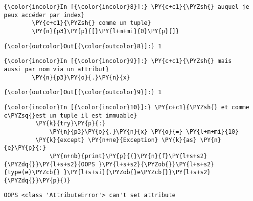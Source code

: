     \begin{Verbatim}[commandchars=\\\{\},frame=single,framerule=0.3mm,rulecolor=\color{cellframecolor}]
{\color{incolor}In [{\color{incolor}8}]:} \PY{c+c1}{\PYZsh{} auquel je peux accéder par index}
        \PY{c+c1}{\PYZsh{} comme un tuple}
        \PY{n}{p3}\PY{p}{[}\PY{l+m+mi}{0}\PY{p}{]}
\end{Verbatim}


\begin{Verbatim}[commandchars=\\\{\},frame=single,framerule=0.3mm,rulecolor=\color{cellframecolor}]
{\color{outcolor}Out[{\color{outcolor}8}]:} 1
\end{Verbatim}
            
    \begin{Verbatim}[commandchars=\\\{\},frame=single,framerule=0.3mm,rulecolor=\color{cellframecolor}]
{\color{incolor}In [{\color{incolor}9}]:} \PY{c+c1}{\PYZsh{} mais aussi par nom via un attribut}
        \PY{n}{p3}\PY{o}{.}\PY{n}{x}
\end{Verbatim}


\begin{Verbatim}[commandchars=\\\{\},frame=single,framerule=0.3mm,rulecolor=\color{cellframecolor}]
{\color{outcolor}Out[{\color{outcolor}9}]:} 1
\end{Verbatim}
            
    \begin{Verbatim}[commandchars=\\\{\},frame=single,framerule=0.3mm,rulecolor=\color{cellframecolor}]
{\color{incolor}In [{\color{incolor}10}]:} \PY{c+c1}{\PYZsh{} et comme c\PYZsq{}est un tuple il est immuable}
         \PY{k}{try}\PY{p}{:}
             \PY{n}{p3}\PY{o}{.}\PY{n}{x} \PY{o}{=} \PY{l+m+mi}{10}
         \PY{k}{except} \PY{n+ne}{Exception} \PY{k}{as} \PY{n}{e}\PY{p}{:}
             \PY{n+nb}{print}\PY{p}{(}\PY{n}{f}\PY{l+s+s2}{\PYZdq{}}\PY{l+s+s2}{OOPS }\PY{l+s+s2}{\PYZob{}}\PY{l+s+s2}{type(e)\PYZcb{} }\PY{l+s+si}{\PYZob{}e\PYZcb{}}\PY{l+s+s2}{\PYZdq{}}\PY{p}{)}
\end{Verbatim}


    \begin{Verbatim}[commandchars=\\\{\},frame=single,framerule=0.3mm,rulecolor=\color{cellframecolor}]
OOPS <class 'AttributeError'> can't set attribute
\end{Verbatim}

